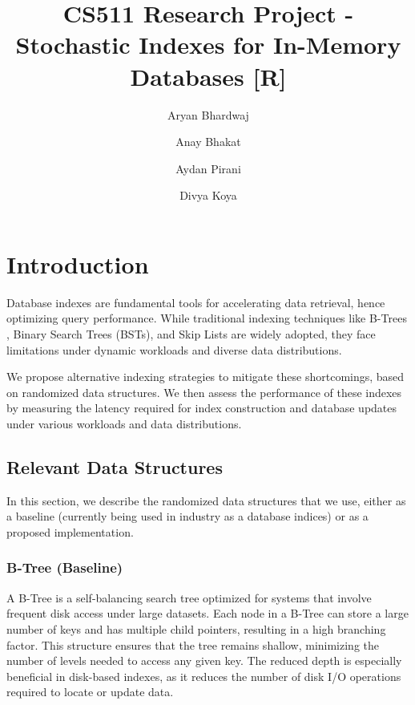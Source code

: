 \documentclass[sigconf]{acmart}
\begin{document}
\title{CS511 Research Project - Stochastic Indexes for In-Memory Databases [R]}

\author{Aryan Bhardwaj}
\author{Anay Bhakat}
\author{Aydan Pirani}
\author{Divya Koya}

\maketitle

\section{Introduction}
Database indexes are fundamental tools for accelerating data retrieval, hence optimizing query performance. While traditional indexing techniques like B-Trees \cite{gao_2024_revisiting}, Binary Search Trees (BSTs), and Skip Lists are widely adopted, they face limitations under dynamic workloads and diverse data distributions.

We propose alternative indexing strategies to mitigate these shortcomings, based on randomized data structures. We then assess the performance of these indexes by measuring the latency required for index construction and database updates under various workloads and data distributions.

\subsection{Relevant Data Structures}
In this section, we describe the randomized data structures that we use, either as a baseline (currently being used in industry as a database indices) or as a proposed implementation.

\subsubsection{B-Tree (Baseline) \cite{btree_ds}}
A B-Tree is a self-balancing search tree optimized for systems that involve frequent disk access under large datasets. Each node in a B-Tree can store a large number of keys and has multiple child pointers, resulting in a high branching factor. This structure ensures that the tree remains shallow, minimizing the number of levels needed to access any given key. The reduced depth is especially beneficial in disk-based indexes, as it reduces the number of disk I/O operations required to locate or update data.
\end{document}
